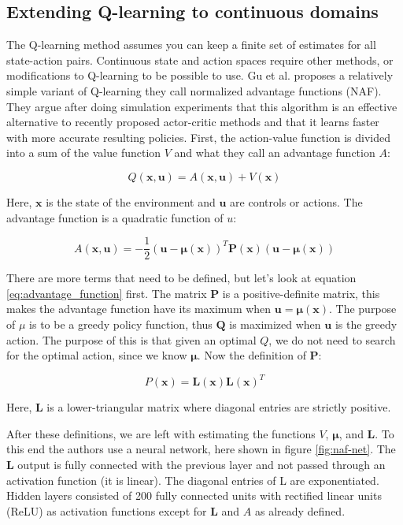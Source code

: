 \subsection{Extending Q-learning to continuous domains}

The Q-learning method assumes you can keep a finite set of estimates for all
state-action pairs. Continuous state and action spaces require other methods,
or modifications to Q-learning to be possible to use. Gu et al.
\cite{gu2016continuous} proposes a relatively simple variant of Q-learning they
call normalized advantage functions (NAF). They argue after doing simulation
experiments that this algorithm is an effective alternative to recently
proposed actor-critic methods and that it learns faster with more accurate
resulting policies. First, the action-value function is divided into a sum of
the value function $V$ and what they call an advantage function $A$:

\begin{equation}
    Q(\mathbf{x}, \mathbf{u}) = A(\mathbf{x}, \mathbf{u}) + V(\mathbf{x})
\end{equation}

Here, $\mathbf{x}$ is the state of the environment and $\mathbf{u}$ are
controls or actions. The advantage function is a quadratic function of $u$:

\begin{equation}
    A(\mathbf{x}, \mathbf{u}) = -\frac{1}{2}(\mathbf{u} - \mathbf{\mu(x)})^T\mathbf{P(x)}(\mathbf{u} - \mathbf{\mu(x)})
    \label{eq:advantage_function}
\end{equation}

There are more terms that need to be defined, but let's look at equation
\ref{eq:advantage_function} first. The matrix $\mathbf{P}$ is a
positive-definite matrix, this makes the advantage function have its maximum
when $\mathbf{u = \mu(x)}$.  The purpose of $\mu$ is to be a greedy policy
function, thus $\mathbf{Q}$ is maximized when $\mathbf{u}$ is the greedy
action. The purpose of this is that given an optimal $Q$, we do not need to
search for the optimal action, since we know $\mathbf{\mu}$. Now the definition
of $\mathbf{P}$:

\begin{equation}
    P(\mathbf{x}) = \mathbf{L(x)L(x)}^T
\end{equation}

Here, $\mathbf{L}$ is a lower-triangular matrix where diagonal entries are
strictly positive.

After these definitions, we are left with estimating the functions $V$,
$\mathbf{\mu}$, and $\mathbf{L}$. To this end the authors use a neural network,
here shown in figure \ref{fig:naf-net}. The $\mathbf{L}$ output is fully
connected with the previous layer and not passed through an activation function
(it is linear). The diagonal entries of L are exponentiated. Hidden layers
consisted of 200 fully connected units with rectified linear units (ReLU) as
activation functions except for $\mathbf{L}$ and $A$ as already defined.

